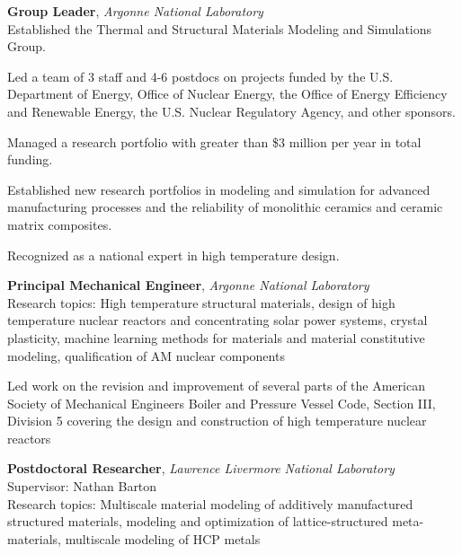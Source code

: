 \usepackage{ifthen}
\usepackage[sorting=ydnt,style=numeric,defernumbers]{biblatex}










\makecvtitle


\textbf{Group Leader}, \emph{Argonne National Laboratory}
\\
Established the Thermal and Structural Materials Modeling and Simulations Group.

Led a team of 3 staff and 4-6 postdocs on projects funded by the U.S. Department of Energy, 
Office of Nuclear Energy, the Office of Energy Efficiency and Renewable Energy, the U.S. Nuclear Regulatory Agency,
and other sponsors.

Managed a research portfolio with greater than \$3 million per year in total funding.  

Established new research portfolios in modeling and simulation for advanced manufacturing processes and the reliability of monolithic ceramics and ceramic matrix composites.

Recognized as a national expert in high temperature design.

\textbf{Principal Mechanical Engineer}, \emph{Argonne National Laboratory}
\\
Research topics: High temperature structural materials, design
of high temperature nuclear reactors and concentrating solar power systems,
crystal plasticity, machine learning
methods for materials and material constitutive modeling,
qualification of AM nuclear components

Led work on the revision and improvement of several parts of the American Society of 
Mechanical Engineers Boiler and Pressure Vessel Code, Section III, Division 5 covering the
design and construction of high temperature nuclear reactors

\textbf{Postdoctoral Researcher}, \emph{Lawrence Livermore National
Laboratory} \\
Supervisor: Nathan Barton \\
Research topics: Multiscale material modeling of additively manufactured
structured materials, modeling and optimization of lattice-structured
meta-materials, multiscale modeling of HCP metals

